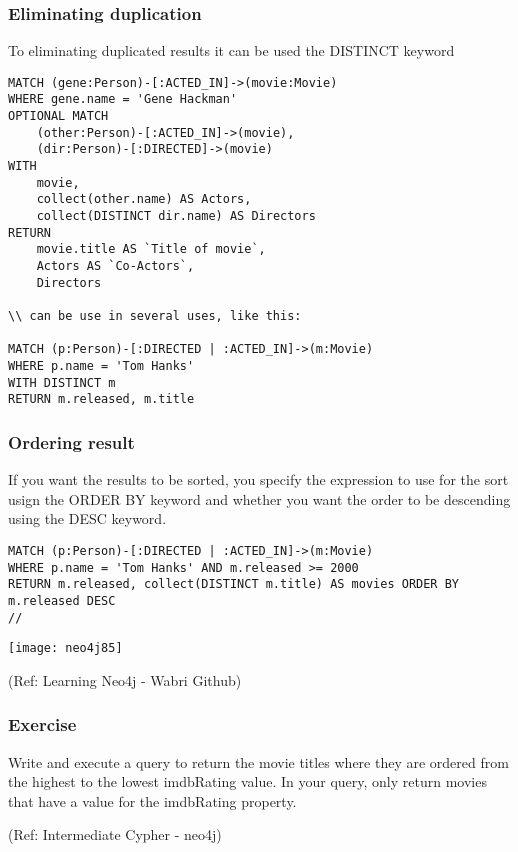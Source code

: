 \begin{frame}[fragile]\frametitle{Eliminating duplication}

To eliminating duplicated results it can be used the DISTINCT keyword



\begin{lstlisting}
MATCH (gene:Person)-[:ACTED_IN]->(movie:Movie)
WHERE gene.name = 'Gene Hackman'
OPTIONAL MATCH
    (other:Person)-[:ACTED_IN]->(movie),
    (dir:Person)-[:DIRECTED]->(movie)
WITH
    movie,
    collect(other.name) AS Actors,
    collect(DISTINCT dir.name) AS Directors
RETURN
    movie.title AS `Title of movie`,
    Actors AS `Co-Actors`,
    Directors

\\ can be use in several uses, like this:

MATCH (p:Person)-[:DIRECTED | :ACTED_IN]->(m:Movie)
WHERE p.name = 'Tom Hanks'
WITH DISTINCT m
RETURN m.released, m.title
\end{lstlisting}

\end{frame}

\begin{frame}[fragile]\frametitle{Ordering result}

If you want the results to be sorted, you specify the expression to use for the sort usign the ORDER BY keyword and whether you want the order to be descending using the DESC keyword.


\begin{lstlisting}
MATCH (p:Person)-[:DIRECTED | :ACTED_IN]->(m:Movie)
WHERE p.name = 'Tom Hanks' AND m.released >= 2000
RETURN m.released, collect(DISTINCT m.title) AS movies ORDER BY m.released DESC
//
\end{lstlisting}

\begin{center}
\texttt{[image: neo4j85]}
\end{center}	  


{\tiny (Ref: Learning Neo4j - Wabri Github)}
\end{frame}

\begin{frame}[fragile]\frametitle{Exercise}

Write and execute a query to return the movie titles where they are ordered from the highest to the lowest imdbRating value. In your query, only return movies that have a value for the imdbRating property.


{\tiny (Ref: Intermediate Cypher - neo4j)}
\end{frame}

